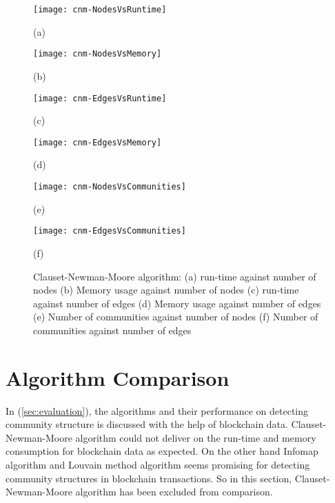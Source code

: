 \begin{figure}[H]
  \centering
  \begin{minipage}[b]{0.4\textwidth}
    \texttt{[image: cnm-NodesVsRuntime]}
    \caption*{(a)}
  \end{minipage}
  \begin{minipage}[b]{0.4\textwidth}
    \texttt{[image: cnm-NodesVsMemory]}
    \caption*{(b)}
  \end{minipage}
%
  \begin{minipage}[b]{0.4\textwidth}
    \texttt{[image: cnm-EdgesVsRuntime]}
    \caption*{(c)}
  \end{minipage}
  \begin{minipage}[b]{0.4\textwidth}
    \texttt{[image: cnm-EdgesVsMemory]}
    \caption*{(d)}
  \end{minipage}
%
  \begin{minipage}[b]{0.4\textwidth}
    \texttt{[image: cnm-NodesVsCommunities]}
    \caption*{(e)}
  \end{minipage}
  \begin{minipage}[b]{0.4\textwidth}
    \texttt{[image: cnm-EdgesVsCommunities]}
    \caption*{(f)}
  \end{minipage}
  \caption{Clauset-Newman-Moore algorithm: (a) run-time against number of nodes (b) Memory usage against number of nodes (c) run-time against number of edges (d) Memory usage against number of edges (e) Number of communities against number of nodes (f) Number of communities against number of edges}
  \label{fig:CNM-runs}
\end{figure}

\vfill
\pagebreak

\section{Algorithm Comparison}
In (\ref{sec:evaluation}), the algorithms and their performance on detecting community structure is discussed with the help of blockchain data. Clauset-Newman-Moore algorithm could not deliver on the run-time and memory consumption for blockchain data as expected. On the other hand Infomap algorithm and Louvain method algorithm seems promising for detecting community structures in blockchain transactions. So in this section, Clauset-Newman-Moore algorithm has been excluded from comparison.


